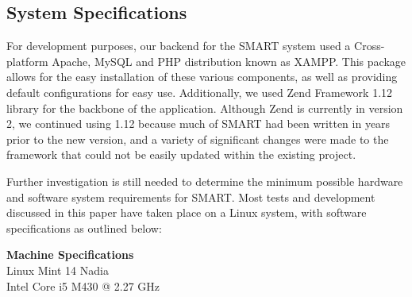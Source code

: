 \documentclass[12pt]{article}
\begin{document}
\begin{appendices}

\clearpage
\section{System Specifications}

For development purposes, our backend for the SMART system used a Cross-platform Apache, MySQL and PHP distribution known as XAMPP. This package allows for the easy installation of these various components, as well as providing default configurations for easy use. Additionally, we used Zend Framework 1.12 library for the backbone of the application. Although Zend is currently in version 2, we continued using 1.12 because much of SMART had been written in years prior to the new version, and a variety of significant changes were made to the framework that could not be easily updated within the existing project.

Further investigation is still needed to determine the minimum possible hardware and software system requirements for SMART. Most tests and development discussed in this paper have taken place on a Linux system, with software specifications as outlined below:
\\

\begin{spacing}{1.0}
\noindent\textbf{Machine Specifications} \\
Linux Mint 14 Nadia \\
Intel Core i5 M430 @ 2.27 GHz \\


\end{spacing}
\end{appendices}
\end{document}
